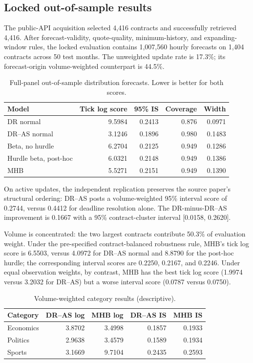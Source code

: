 \subsection{Locked out-of-sample results}

The public-API acquisition selected 4,416 contracts and successfully retrieved 4,416. After forecast-validity, quote-quality, minimum-history, and expanding-window rules, the locked evaluation contains 1,007,560 hourly forecasts on 1,404 contracts across 50 test months. The unweighted update rate is 17.3\%; its forecast-origin volume-weighted counterpart is 44.5\%.

\begin{table}[ht]
\centering
\caption{Full-panel out-of-sample distribution forecasts. Lower is better for both scores.}
\label{tab:main-results}
\small
\begin{tabular}{lrrrr}
\toprule
Model & Tick log score & 95\% IS & Coverage & Width \\
\midrule
DR normal & 9.5984 & 0.2413 & 0.876 & 0.0971 \\
DR--AS normal & 3.1246 & 0.1896 & 0.980 & 0.1483 \\
Beta, no hurdle & 6.2704 & 0.2125 & 0.949 & 0.1286 \\
Hurdle beta, post-hoc & 6.0321 & 0.2148 & 0.949 & 0.1386 \\
MHB & 5.5271 & 0.2151 & 0.949 & 0.1390 \\
\bottomrule
\end{tabular}
\end{table}

On active updates, the independent replication preserves the source paper's structural ordering: DR--AS posts a volume-weighted 95\% interval score of 0.2744, versus 0.4412 for deadline resolution alone. The DR-minus-DR--AS improvement is 0.1667 with a 95\% contract-cluster interval [0.0158, 0.2620].

Volume is concentrated: the two largest contracts contribute 50.3\% of evaluation weight. Under the pre-specified contract-balanced robustness rule, MHB's tick log score is 6.5503, versus 4.0972 for DR--AS normal and 8.8790 for the post-hoc hurdle; the corresponding interval scores are 0.2250, 0.2167, and 0.2246. Under equal observation weights, by contrast, MHB has the best tick log score (1.9974 versus 3.2032 for DR--AS) but a worse interval score (0.0787 versus 0.0750).

\begin{table}[ht]
\centering
\caption{Volume-weighted category results (descriptive).}
\label{tab:category-results}
\small
\begin{tabular}{lrrrr}
\toprule
Category & DR--AS log & MHB log & DR--AS IS & MHB IS \\
\midrule
Economics & 3.8702 & 3.4998 & 0.1857 & 0.1933 \\
Politics & 2.9638 & 3.4579 & 0.1589 & 0.1934 \\
Sports & 3.1669 & 9.7104 & 0.2435 & 0.2593 \\
\bottomrule
\end{tabular}
\end{table}

